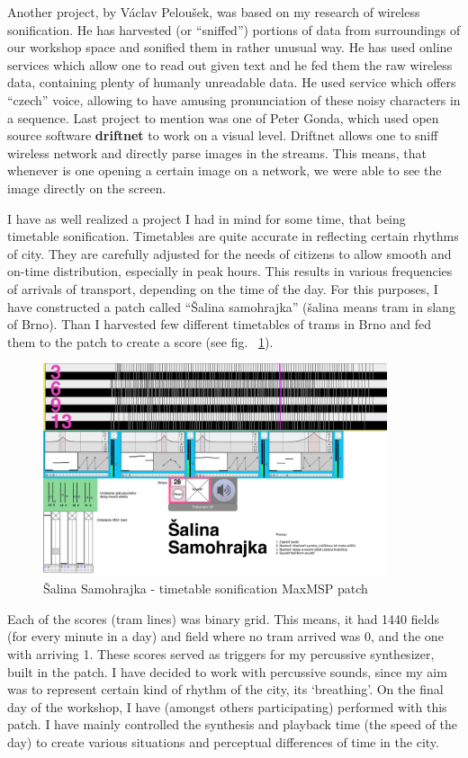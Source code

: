 \documentclass[12pt,a4paper,oneside]{report}
\begin{document}
Another project, by Václav Peloušek, was based on my research of wireless sonification. He has harvested (or ``sniffed'') portions of data from surroundings of our workshop space and sonified them in rather unusual way. He has used online services which allow one to read out given text and he fed them the raw wireless data, containing plenty of humanly unreadable data. He used service which offers ``czech'' voice, allowing to have amusing pronunciation of these noisy characters in a sequence. Last project to mention was one of Peter Gonda, which used open source software \textbf{driftnet} to work on a visual level. Driftnet allows one to sniff wireless network and directly parse images in the streams. This means, that whenever is one opening a certain image on a network, we were able to see the image directly on the screen.

I have as well realized a project I had in mind for some time, that being timetable sonification. Timetables are quite accurate in reflecting certain rhythms of city. They are carefully adjusted for the needs of citizens to allow smooth and on-time distribution, especially in peak hours. This results in various frequencies of arrivals of transport, depending on the time of the day. For this purposes, I have constructed a patch called ``Šalina samohrajka'' (šalina means tram in slang of Brno). Than I harvested few different timetables of trams in Brno and fed them to the patch to create a score (see fig. ~\ref{fig:salina}).

\begin{figure}  
  \centering
    \includegraphics[width=0.9\textwidth]{img/salina}
	\caption{Šalina Samohrajka - timetable sonification MaxMSP patch}
	\label{fig:salina}
\end{figure}

Each of the scores (tram lines) was binary grid. This means, it had 1440 fields (for every minute in a day) and field where no tram arrived was 0, and the one with arriving 1. These scores served as triggers for my percussive synthesizer, built in the patch. I have decided to work with percussive sounds, since my aim was to represent certain kind of rhythm of the city, its `breathing'. On the final day of the workshop, I have (amongst others participating) performed with this patch. I have mainly controlled the synthesis and playback time (the speed of the day) to create various situations and perceptual differences of time in the city. 
\end{document}
